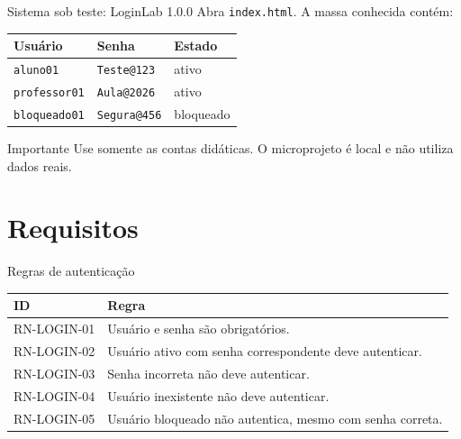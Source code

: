 \begin{frame}{Sistema sob teste: LoginLab 1.0.0}
  Abra \texttt{index.html}. A massa conhecida contém:
  \vspace{4mm}

  \small
  \begin{tabular}{p{36mm}p{37mm}p{27mm}}
    \toprule
    \textbf{Usuário} & \textbf{Senha} & \textbf{Estado}\\
    \midrule
    \texttt{aluno01} & \texttt{Teste@123} & ativo\\
    \texttt{professor01} & \texttt{Aula@2026} & ativo\\
    \texttt{bloqueado01} & \texttt{Segura@456} & bloqueado\\
    \bottomrule
  \end{tabular}
  \vspace{6mm}

  \begin{alertblock}{Importante}
    Use somente as contas didáticas. O microprojeto é local e não utiliza dados reais.
  \end{alertblock}
\end{frame}

\section{Requisitos}

\begin{frame}{Regras de autenticação}
  \small
  \begin{tabular}{p{24mm}p{91mm}}
    \toprule
    \textbf{ID} & \textbf{Regra}\\
    \midrule
    RN-LOGIN-01 & Usuário e senha são obrigatórios.\\
    RN-LOGIN-02 & Usuário ativo com senha correspondente deve autenticar.\\
    RN-LOGIN-03 & Senha incorreta não deve autenticar.\\
    RN-LOGIN-04 & Usuário inexistente não deve autenticar.\\
    RN-LOGIN-05 & Usuário bloqueado não autentica, mesmo com senha correta.\\
    \bottomrule
  \end{tabular}
\end{frame}

